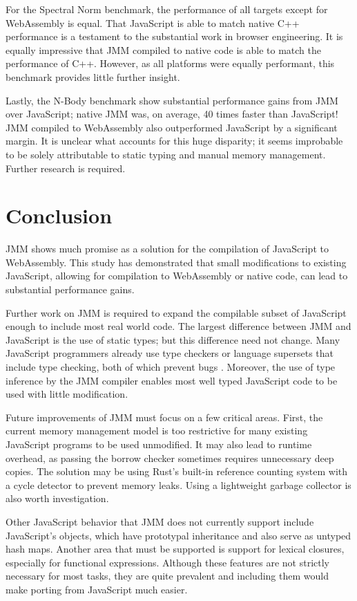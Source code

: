 \documentclass[12pt]{article}
\begin{document}
	For the Spectral Norm benchmark, the performance of all targets except for WebAssembly is equal. That JavaScript is able to match native C++ performance is a testament to the substantial work in browser engineering. It is equally impressive that JMM compiled to native code is able to match the performance of C++. However, as all platforms were equally performant, this benchmark provides little further insight.
	
	Lastly, the N-Body benchmark show substantial performance gains from JMM over JavaScript; native JMM was, on average, 40 times faster than JavaScript! JMM compiled to WebAssembly also outperformed JavaScript by a significant margin. It is unclear what accounts for this huge disparity; it seems improbable to be solely attributable to static typing and manual memory management. Further research is required.

	\section{Conclusion}
	
	JMM shows much promise as a solution for the compilation of JavaScript to WebAssembly. This study has demonstrated that small modifications to existing JavaScript, allowing for compilation to WebAssembly or native code, can lead to substantial performance gains.
	
	Further work on JMM is required to expand the compilable subset of JavaScript enough to include most real world code. The largest difference between JMM and JavaScript is the use of static types; but this difference need not change. Many JavaScript programmers already use type checkers or language supersets that include type checking, both of which prevent bugs \cite{gao2017type}. Moreover, the use of type inference by the JMM compiler enables most well typed JavaScript code to be used with little modification.
	
	Future improvements of JMM must focus on a few critical areas. First, the current memory management model is too restrictive for many existing JavaScript programs to be used unmodified. It may also lead to runtime overhead, as passing the borrow checker sometimes requires unnecessary deep copies. The solution may be using Rust's built-in reference counting system \cite{Klabnik} with a cycle detector to prevent memory leaks. Using a lightweight garbage collector is also worth investigation.
	
	Other JavaScript behavior that JMM does not currently support include JavaScript's objects, which have prototypal inheritance and also serve as untyped hash maps. Another area that must be supported is support for lexical closures, especially for functional expressions. Although these features are not strictly necessary for most tasks, they are quite prevalent and including them would make porting from JavaScript much easier.
	
\end{document}
